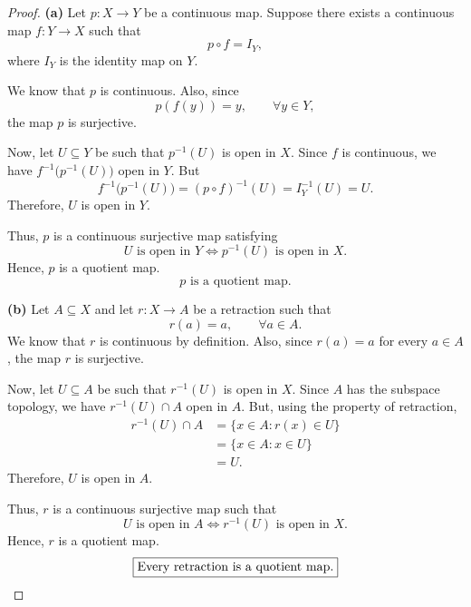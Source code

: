 
\begin{proof}
\textbf{(a)} Let $p\colon X\to Y$ be a continuous map. Suppose there exists a continuous map
$f\colon Y\to X$ such that
\[ p\circ f=I_Y, \]
where $I_Y$ is the identity map on $Y$.

We know that $p$ is continuous. Also, since
\[ p(f(y))=y,\qquad\forall y\in Y, \]
the map $p$ is surjective.

Now, let $U\subseteq Y$ be such that $p^{-1}(U)$ is open in $X$. Since $f$ is continuous, we
have $f^{-1}\bigl(p^{-1}(U)\bigr)$ open in $Y$. But
\[ f^{-1}\bigl(p^{-1}(U)\bigr)=(p\circ f)^{-1}(U)=I_Y^{-1}(U)=U. \]
Therefore, $U$ is open in $Y$.

Thus, $p$ is a continuous surjective map satisfying
\[ U\text{ is open in }Y\iff p^{-1}(U)\text{ is open in }X. \]
Hence, $p$ is a quotient map.
\[ \boxed{p\text{ is a quotient map.}} \]

\medskip
\textbf{(b)} Let $A\subseteq X$ and let $r\colon X\to A$ be a retraction such that
\[ r(a)=a,\qquad\forall a\in A. \]
We know that $r$ is continuous by definition. Also, since $r(a)=a$ for every $a\in A$, the map
$r$ is surjective.

Now, let $U\subseteq A$ be such that $r^{-1}(U)$ is open in $X$. Since $A$ has the subspace
topology, we have $r^{-1}(U)\cap A$ open in $A$. But, using the property of retraction,
\begin{align*}
  r^{-1}(U)\cap A &= \{x\in A : r(x)\in U\}\\
                  &= \{x\in A : x\in U\}\\
                  &= U.
\end{align*}
Therefore, $U$ is open in $A$.

Thus, $r$ is a continuous surjective map such that
\[ U\text{ is open in }A\iff r^{-1}(U)\text{ is open in }X. \]
Hence, $r$ is a quotient map.
\[ \boxed{\text{Every retraction is a quotient map.}} \qedhere \]
\end{proof}
